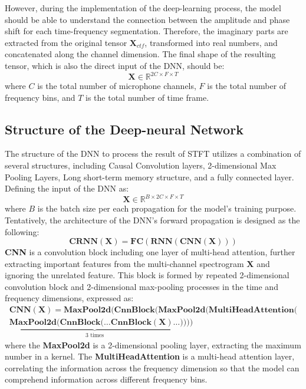 However, during the implementation of the deep-learning process, the model should be able to understand the connection between the amplitude and phase shift for each time-frequency segmentation. Therefore, the imaginary parts are extracted from the original tensor \(\mathbf{X}_{ctf}\), transformed into real numbers, and concatenated along the channel dimension. The final shape of the resulting tensor, which is also the direct input of the DNN, should be:
\[
    \mathbf{X} \in \mathbb{R}^{2C\times F \times T}
\]
where \(C\) is the total number of microphone channels, \(F\) is the total number of frequency bins, and \(T\) is the total number of time frame.


\subsection*{Structure of the Deep-neural Network}
The structure of the DNN to process the result of STFT utilizes a combination of several structures, including Causal Convolution layers, 2-dimensional Max Pooling Layers,  Long short-term memory structure, and a fully connected layer. 
Defining the input of the DNN as:
\[
    \mathbf{X} \in \mathbb{R}^{B \times 2C\times F \times T}
\]
where \(B\) is the batch size per each propagation for the model's training purpose.\\
Tentatively, the architecture of the DNN's forward propagation is designed as the following:
\[
    \textbf{CRNN}(\mathbf{X}) = \textbf{FC}(\textbf{RNN}(\textbf{CNN}(\mathbf{X})))
\]
\textbf{CNN} is a convolution block including one layer of multi-head attention, further extracting important features from the multi-channel spectrogram \(\mathbf{X}\) and ignoring the unrelated feature. This block is formed by repeated 2-dimensional convolution block and 2-dimensional max-pooling processes in the time and frequency dimensions, expressed as:
\begin{align*}
    \textbf{CNN}(\mathbf{X}) = \textbf{MaxPool2d}(\textbf{CnnBlock}(\textbf{MaxPool2d}(\textbf{MultiHeadAttention}( \\
    \underbrace{\textbf{MaxPool2d}(\textbf{CnnBlock}(\ldots \textbf{CnnBlock}(\mathbf{X})\ldots}_{\text{3 times}}))))
\end{align*}
where the \textbf{MaxPool2d} is a 2-dimensional pooling layer, extracting the maximum number in a kernel. The \textbf{MultiHeadAttention} is a multi-head attention layer, correlating the information across the frequency dimension so that the model can comprehend information across different frequency bins.
